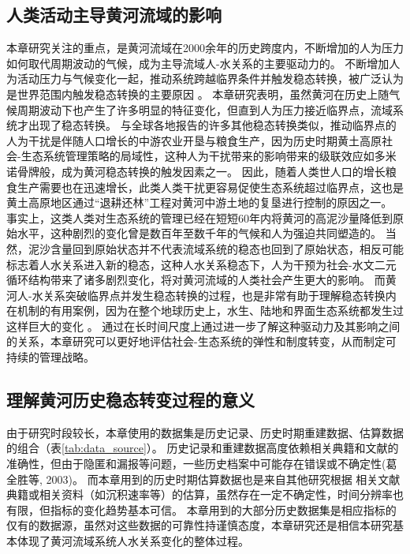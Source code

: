 
\subsection{人类活动主导黄河流域的影响}
\label{ch3:sec:human-activity}

本章研究关注的重点，是黄河流域在2000余年的历史跨度内，不断增加的人为压力如何取代周期波动的气候，成为主导流域人-水关系的主要驱动力的。
不断增加人为活动压力与气候变化一起，推动系统跨越临界条件并触发稳态转换，被广泛认为是世界范围内触发稳态转换的主要原因 \cite{scheffer2001,scheffer2003}。
本章研究表明，虽然黄河在历史上随气候周期波动下也产生了许多明显的特征变化，但直到人为压力接近临界点，流域系统才出现了稳态转换。
与全球各地报告的许多其他稳态转换类似，推动临界点的人为干扰是伴随人口增长的中游农业开垦与粮食生产，因为历史时期黄土高原社会-生态系统管理策略的局域性，这种人为干扰带来的影响带来的级联效应如多米诺骨牌般，成为黄河稳态转换的触发因素之一\cite{rocha2018}。
因此，随着人类世人口的增长粮食生产需要也在迅速增长，此类人类干扰更容易促使生态系统超过临界点，这也是黄土高原地区通过“退耕还林”工程对黄河中游土地的复垦进行控制的原因之一。
事实上，这类人类对生态系统的管理已经在短短60年内将黄河的高泥沙量降低到原始水平，这种剧烈的变化曾是数百年至数千年的气候和人为强迫共同塑造的\cite{wang2016e, ji2018}。
当然，泥沙含量回到原始状态并不代表流域系统的稳态也回到了原始状态，相反可能标志着人水关系进入新的稳态，这种人水关系稳态下，人为干预为社会-水文二元循环结构带来了诸多剧烈变化，将对黄河流域的人类社会产生更大的影响。
而黄河人-水关系突破临界点并发生稳态转换的过程，也是非常有助于理解稳态转换内在机制的有用案例，因为在整个地球历史上，水生、陆地和界面生态系统都发生过这样巨大的变化 \cite{hughes2013, rocha2018}。
通过在长时间尺度上通过进一步了解这种驱动力及其影响之间的关系，本章研究可以更好地评估社会-生态系统的弹性和制度转变，从而制定可持续的管理战略\cite{scheffer2003}。

\subsection{理解黄河历史稳态转变过程的意义}

由于研究时段较长，本章使用的数据集是历史记录、历史时期重建数据、估算数据的组合（表\ref{tab:data_source}）。
历史记录和重建数据高度依赖相关典籍和文献的准确性，但由于隐匿和漏报等问题，一些历史档案中可能存在错误或不确定性(葛全胜等, 2003)。
而本章用到的历史时期估算数据也是来自其他研究根据 相关文献典籍或相关资料（如沉积速率等）的估算，虽然存在一定不确定性，时间分辨率也有限，但指标的变化趋势基本可信。
本章用到的大部分历史数据集是相应指标的仅有的数据源，虽然对这些数据的可靠性持谨慎态度，本章研究还是相信本研究基本体现了黄河流域系统人水关系变化的整体过程。
